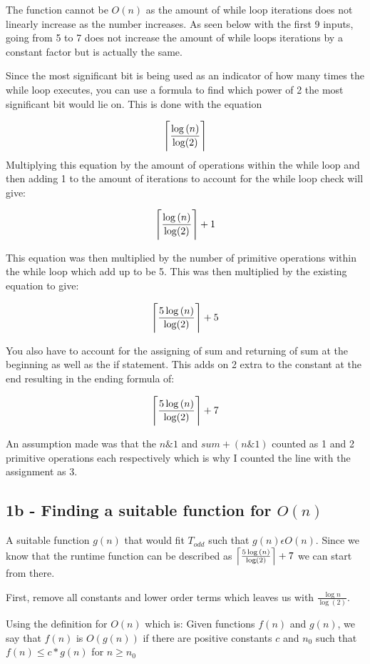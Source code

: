 \documentclass[oneside, a4paper]{article}
\DeclarePairedDelimiter\ceil{\lceil}{\rceil}
\begin{document}
The function cannot be $O(n)$ as the amount of while loop iterations does not linearly increase as the number increases. As seen below with the first 9 inputs, going from 5 to 7 does not increase the amount of while loops iterations by a constant factor but is actually the same.



Since the most significant bit is being used as an indicator of how many times the while loop executes, you can use a formula to find which power of 2 the most significant bit would lie on. This is done with the equation 


$$\ceil[\Bigg]{\frac{\log{(n)}}{\log(2)}}$$ 
Multiplying this equation by the amount of operations within the while loop and then adding 1 to the amount of iterations to account for the while loop check will give:

$$\ceil[\Bigg]{\frac{\log{(n)}}{\log(2)}} + 1$$ 

This equation was then multiplied by the number of primitive operations within the while loop which add up to be 5. This was then multiplied by the existing equation to give:

$$\ceil[\Bigg]{\frac{5\log{(n)}}{\log(2)}} + 5$$ 

You also have to account for the assigning of sum and returning of sum at the beginning as well as the if statement. This adds on 2 extra to the constant at the end resulting in the ending formula of:

$$\ceil[\Bigg]{\frac{5\log{(n)}}{\log(2)}} + 7$$ 

An assumption made was that the $n \& 1$ and $sum + (n \& 1)$ counted as 1 and 2 primitive operations each respectively which is why I counted the line with the assignment as 3.

\subsection*{1b - Finding a suitable function for $O(n)$}

A suitable function $g(n)$ that would fit $T_{odd}$ such that $g(n) \epsilon O(n)$. Since we know that the runtime function can be described as $\ceil[\Big]{\frac{5\log{(n)}}{\log(2)}} + 7$ we can start from there.

First, remove all constants and lower order terms which leaves us with $\frac{\log{n}}{\log(2)}$. 

Using the definition for $O(n)$ which is:
Given functions $f(n)$ and $g(n)$, we say that $f(n)$ is $O(g(n))$ if there are positive constants $c$ and $n_0$ such that 
$f(n) \leq c * g(n)$ for $n \geq n_0$
\end{document}
